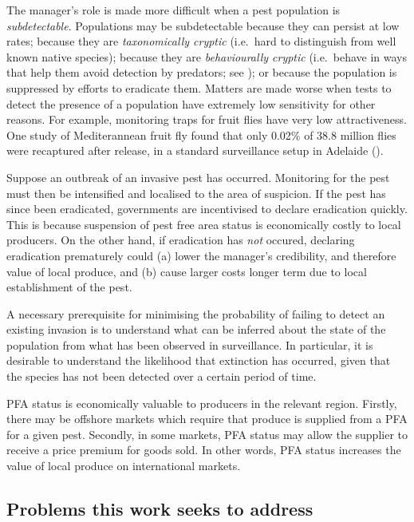 \documentclass[
]{book}
\begin{document}
The manager's role is made more difficult when a pest population is \emph{subdetectable}. Populations may be subdetectable because they can persist at low rates; because they are \emph{taxonomically cryptic} (i.e.~hard to distinguish from well known native species); because they are \emph{behaviourally cryptic} (i.e.~behave in ways that help them avoid detection by predators; see \citet{kery2002}); or because the population is suppressed by efforts to eradicate them. Matters are made worse when tests to detect the presence of a population have extremely low sensitivity for other reasons. For example, monitoring traps for fruit flies have very low attractiveness. One study of Mediterannean fruit fly found that only 0.02\% of 38.8 million flies were recaptured after release, in a standard surveillance setup in Adelaide (\citet{ms2007}).

Suppose an outbreak of an invasive pest has occurred. Monitoring for the pest must then be intensified and localised to the area of suspicion. If the pest has since been eradicated, governments are incentivised to declare eradication quickly. This is because suspension of pest free area status is economically costly to local producers. On the other hand, if eradication has \emph{not} occured, declaring eradication prematurely could (a) lower the manager's credibility, and therefore value of local produce, and (b) cause larger costs longer term due to local establishment of the pest.

A necessary prerequisite for minimising the probability of failing to detect an existing invasion is to understand what can be inferred about the state of the population from what has been observed in surveillance. In particular, it is desirable to understand the likelihood that extinction has occurred, given that the species has not been detected over a certain period of time.

PFA status is economically valuable to producers in the relevant region. Firstly, there may be offshore markets which require that produce is supplied from a PFA for a given pest. Secondly, in some markets, PFA status may allow the supplier to receive a price premium for goods sold. In other words, PFA status increases the value of local produce on international markets.

\hypertarget{problems-this-work-seeks-to-address}{%
\subsection{Problems this work seeks to address}\label{problems-this-work-seeks-to-address}}
\end{document}
